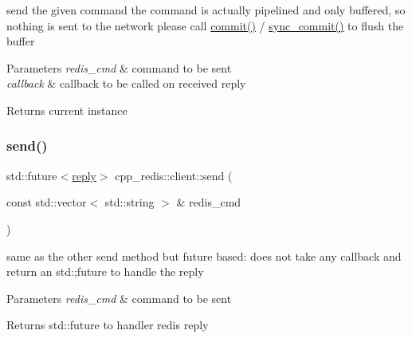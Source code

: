 send the given command the command is actually pipelined and only buffered, so nothing is sent to the network please call \hyperlink{classcpp__redis_1_1client_a36a48d61a4900e88fd67795ca59cbea3}{commit()} / \hyperlink{classcpp__redis_1_1client_a23c8a27ee691c52713411ae91e1391fb}{sync\+\_\+commit()} to flush the buffer


\begin{DoxyParams}{Parameters}
{\em redis\+\_\+cmd} & command to be sent \\
\hline
{\em callback} & callback to be called on received reply \\
\hline
\end{DoxyParams}
\begin{DoxyReturn}{Returns}
current instance 
\end{DoxyReturn}
\mbox{\label{classcpp__redis_1_1client_ad6216d6587d50694c16d68e8e182b0be}} 
\subsubsection{\texorpdfstring{send()}{send()}\hspace{0.1cm}{\footnotesize\ttfamily [2/2]}}
{\footnotesize\ttfamily std\+::future$<$\hyperlink{classcpp__redis_1_1reply}{reply}$>$ cpp\+\_\+redis\+::client\+::send (\begin{DoxyParamCaption}\item[{const std\+::vector$<$ std\+::string $>$ \&}]{redis\+\_\+cmd }\end{DoxyParamCaption})}

same as the other send method but future based\+: does not take any callback and return an std\+:;future to handle the reply


\begin{DoxyParams}{Parameters}
{\em redis\+\_\+cmd} & command to be sent \\
\hline
\end{DoxyParams}
\begin{DoxyReturn}{Returns}
std\+::future to handler redis reply 
\end{DoxyReturn}
\mbox{\label{classcpp__redis_1_1client_a6d654139ca804e9ee2ac0d0683878ece}} 

